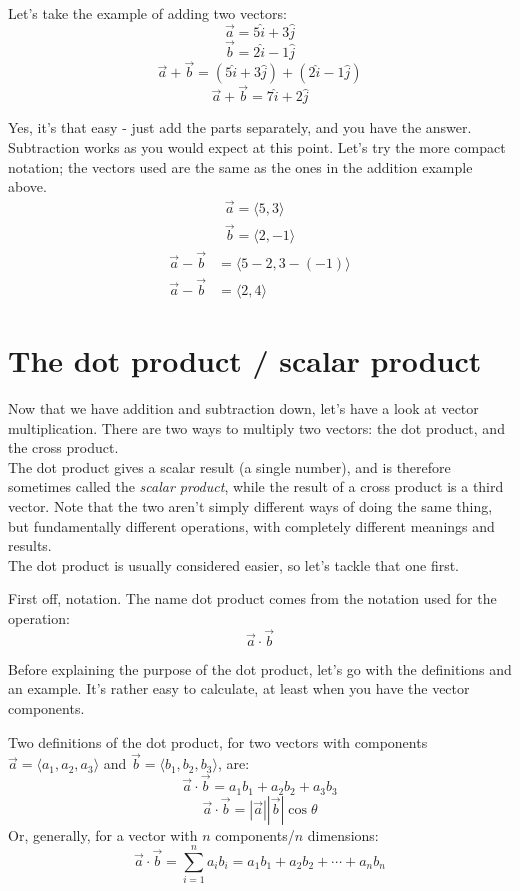 \documentclass[12pt,a4paper]{report}
\begin{document}
Let's take the example of adding two vectors:
\[ \vec{a} = 5 \hat{i} + 3 \hat{j} \]
\[ \vec{b} = 2 \hat{i} - 1 \hat{j} \]
\[ \vec{a} + \vec{b} = (5 \hat{i} + 3 \hat{j}) + (2 \hat{i} - 1 \hat{j}) \]
\[ \vec{a} + \vec{b} = 7 \hat{i} + 2 \hat{j} \]

Yes, it's that easy - just add the parts separately, and you have the answer. Subtraction works as you would expect at this point. Let's try the more compact notation; the vectors used are the same as the ones in the addition example above.
\begin{align*}
\vec{a} = \langle 5, 3 \rangle\\
\vec{b} = \langle 2, -1 \rangle
\end{align*}
\begin{align*}
\vec{a} - \vec{b} &= \langle 5 - 2, 3 - (-1) \rangle\\
\vec{a} - \vec{b} &= \langle 2, 4 \rangle
\end{align*}

\section{The dot product / scalar product}
Now that we have addition and subtraction down, let's have a look at vector multiplication. There are two ways to multiply two vectors: the dot product, and the cross product.\\
The dot product gives a scalar result (a single number), and is therefore sometimes called the \emph{scalar product}, while the result of a cross product is a third vector.
Note that the two aren't simply different ways of doing the same thing, but fundamentally different operations, with completely different meanings and results.\\
The dot product is usually considered easier, so let's tackle that one first.

First off, notation. The name dot product comes from the notation used for the operation:
\[ \vec{a} \cdot \vec{b} \]

Before explaining the purpose of the dot product, let's go with the definitions and an example. It's rather easy to calculate, at least when you have the vector components.

Two definitions of the dot product, for two vectors with components $\vec{a} = \langle a_1, a_2, a_3 \rangle$ and $\vec{b} = \langle b_1, b_2, b_3 \rangle$, are:
\[ \vec{a} \cdot \vec{b} = a_1 b_1 + a_2 b_2 + a_3 b_3 \]
\[ \vec{a} \cdot \vec{b} = |\vec{a}| |\vec{b}| \cos{\theta} \]
Or, generally, for a vector with $n$ components/$n$ dimensions:
\[ \vec{a} \cdot \vec{b} = \sum_{i=1}^n a_i b_i = a_1 b_1 + a_2 b_2 + \cdots + a_n b_n \]
\end{document}
